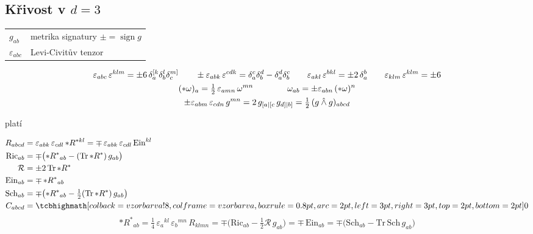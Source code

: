 \subsection*{Křivost v $d = 3$}
\begin{tabular}{@{}ll}
  $g_{ab}$ & metrika signatury \qquad $\pm = \operatorname{sign}g$ \\
  $\varepsilon_{abc}$ & Levi-Civitův tenzor
\end{tabular}
\begin{gather*}
  \varepsilon_{abc}\,\varepsilon^{klm} = \pm 6\,\delta^{[k}_{a}\delta^{l}_{b}\delta^{m]}_{c}
  \qquad
  \pm\varepsilon_{abk}\,\varepsilon^{cdk} = \delta^{c}_{a}\delta^{d}_{b} - \delta^{d}_{a}\delta^{c}_{b}
  \qquad
  \varepsilon_{akl}\,\varepsilon^{bkl} = \pm 2\,\delta^{b}_{a}
  \qquad
  \varepsilon_{klm}\,\varepsilon^{klm} = \pm 6 \\
  ({*}\omega)_a = \tfrac12\,\varepsilon_{amn}\,\omega^{mn} \qquad\qquad \omega_{ab} = \pm\varepsilon_{abn}\,({*}\omega)^{n} \\
  \pm\varepsilon_{abm}\,\varepsilon_{cdn}\,g^{mn} = 2\,g_{[a|[c}\,g_{d]|b]} = \tfrac12\,(g\owedge g)_{abcd}
\end{gather*}

platí
\begin{veta}[Křivost v $d = 3$]
\begin{align*}
  R_{abcd} &= \varepsilon_{abk}\,\varepsilon_{cdl}\,{*}R^{*kl} = \mp\,\varepsilon_{abk}\,\varepsilon_{cdl}\,\mathrm{Ein}^{kl} \\
  \mathrm{Ric}_{ab} &= \mp\big({*}R^{*}{}_{ab} - (\mathrm{Tr}\,{*}R^{*})\,g_{ab}\big) \\
  \mathcal{R} &= \pm 2\,\mathrm{Tr}\,{*}R^{*} \\
  \mathrm{Ein}_{ab} &= \mp\,{*}R^{*}{}_{ab} \\
  \mathrm{Sch}_{ab} &= \mp\big({*}R^{*}{}_{ab} - \tfrac12(\mathrm{Tr}\,{*}R^{*})\,g_{ab}\big) \\
  C_{abcd} &= \vzorec{0}
\end{align*}
\[
  {*}R^{*}{}_{ab} = \tfrac14\,\varepsilon_a{}^{kl}\,\varepsilon_b{}^{mn}\,R_{klmn}
  = \mp\big(\mathrm{Ric}_{ab} - \tfrac12\mathcal{R}\,g_{ab}\big) = \mp\,\mathrm{Ein}_{ab} = \mp\big(\mathrm{Sch}_{ab} - \mathrm{Tr}\,\mathrm{Sch}\,g_{ab}\big)
\]
\end{veta}

